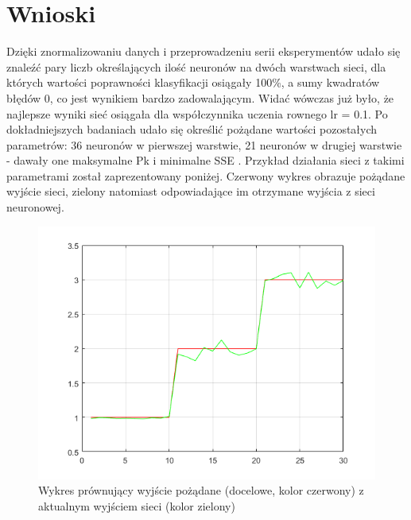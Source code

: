\documentclass[a4paper, 12pt]{article}
\begin{document}
\clearpage

\section{Wnioski}
Dzięki znormalizowaniu danych i przeprowadzeniu serii eksperymentów udało się znaleźć pary liczb określających ilość neuronów na dwóch warstwach sieci, dla których wartości poprawności klasyfikacji osiągały 100\%, a sumy kwadratów błędów 0, co jest wynikiem bardzo zadowalającym. Widać wówczas już było, że najlepsze wyniki sieć osiągała dla współczynnika uczenia rownego lr = 0.1. Po dokładniejszych badaniach udało się określić pożądane wartości pozostałych parametrów: 36 neuronów w pierwszej warstwie, 21 neuronów w drugiej warstwie - dawały one maksymalne Pk i minimalne SSE . Przykład działania sieci z takimi parametrami został zaprezentowany poniżej. Czerwony wykres obrazuje pożądane wyjście sieci, zielony natomiast odpowiadające im otrzymane wyjścia z sieci neuronowej.

\begin{figure}[ht]
	\centering
	\includegraphics[width=14cm]{zielony}
	\caption{Wykres prównujący wyjście pożądane (docelowe, kolor czerwony) z aktualnym wyjściem sieci (kolor zielony)}
\label{Fig:lr1 sse dane}
\end{figure}
\end{document}
